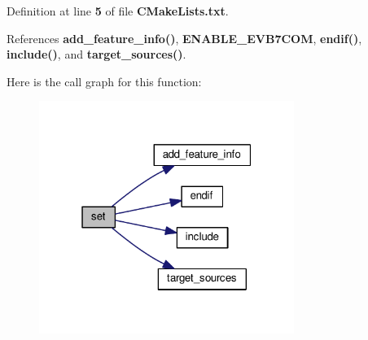 Definition at line {\bf 5} of file {\bf C\+Make\+Lists.\+txt}.



References {\bf add\+\_\+feature\+\_\+info()}, {\bf E\+N\+A\+B\+L\+E\+\_\+\+E\+V\+B7\+C\+OM}, {\bf endif()}, {\bf include()}, and {\bf target\+\_\+sources()}.



Here is the call graph for this function\+:
\nopagebreak
\begin{figure}[H]
\begin{center}
\leavevmode
\includegraphics[width=235pt]{db/d8f/src_2ConnectionEVB7COM_2CMakeLists_8txt_ab81495574c55acc50d90940f5348debf_cgraph}
\end{center}
\end{figure}


